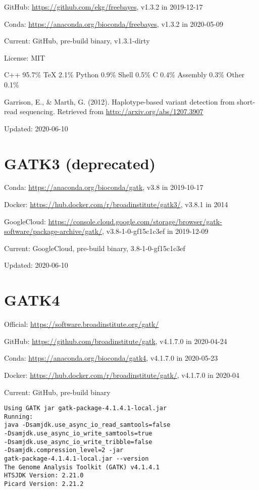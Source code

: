 \documentclass[]{article}
\begin{document}
GitHub: \url{https://github.com/ekg/freebayes}, v1.3.2 in 2019-12-17

Conda: \url{https://anaconda.org/bioconda/freebayes}, v1.3.2 in 2020-05-09

Current: GitHub, pre-build binary, v1.3.1-dirty

License: MIT

C++ 95.7\% TeX 2.1\% Python 0.9\% Shell 0.5\% C 0.4\% Assembly 0.3\% Other 0.1\%

Garrison, E., \& Marth, G. (2012). Haplotype-based variant detection from short-read sequencing. Retrieved from \url{http://arxiv.org/abs/1207.3907}

Updated: 2020-06-10


\section{GATK3 (deprecated)}

Conda: \url{https://anaconda.org/bioconda/gatk}, v3.8 in 2019-10-17

Docker: \url{https://hub.docker.com/r/broadinstitute/gatk3/}, v3.8.1 in 2014

GoogleCloud: \url{https://console.cloud.google.com/storage/browser/gatk-software/package-archive/gatk/}, v3.8-1-0-gf15c1c3ef in 2019-12-09

Current: GoogleCloud, pre-build binary, 3.8-1-0-gf15c1c3ef

Updated: 2020-06-10

\section{GATK4}

Official: \url{https://software.broadinstitute.org/gatk/}

GitHub: \url{https://github.com/broadinstitute/gatk}, v4.1.7.0 in 2020-04-24

Conda: \url{https://anaconda.org/bioconda/gatk4}, v4.1.7.0 in 2020-05-23

Docker: \url{https://hub.docker.com/r/broadinstitute/gatk/}, v4.1.7.0 in 2020-04

Current: GitHub, pre-build binary

\begin{verbatim}
Using GATK jar gatk-package-4.1.4.1-local.jar
Running:
java -Dsamjdk.use_async_io_read_samtools=false
-Dsamjdk.use_async_io_write_samtools=true
-Dsamjdk.use_async_io_write_tribble=false
-Dsamjdk.compression_level=2 -jar 
gatk-package-4.1.4.1-local.jar --version
The Genome Analysis Toolkit (GATK) v4.1.4.1
HTSJDK Version: 2.21.0
Picard Version: 2.21.2
\end{verbatim}
\end{document}
